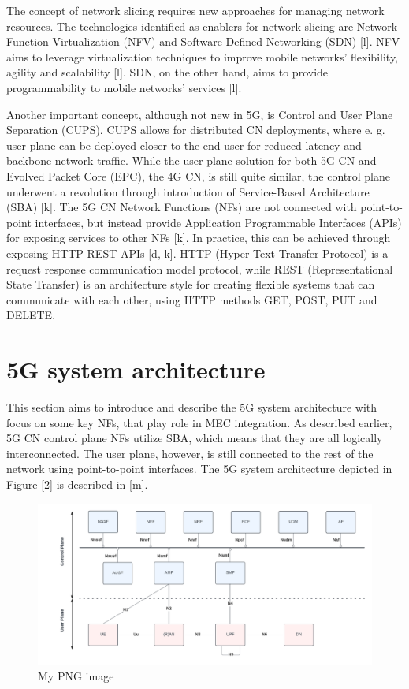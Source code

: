 \documentclass[12pt,a4paper,twoside]{report}
\begin{document}
The concept of network slicing requires new approaches for managing network resources. The technologies identified as enablers for network slicing are Network Function Virtualization (NFV) and Software Defined Networking (SDN) [l]. NFV aims to leverage virtualization techniques to improve mobile networks’ flexibility, agility and scalability [l]. SDN, on the other hand, aims to provide programmability to mobile networks’ services [l]. 
  
Another important concept, although not new in 5G, is Control and User Plane Separation (CUPS). CUPS allows for distributed CN deployments, where e. g. user plane can be deployed closer to the end user for reduced latency and backbone network traffic. While the user plane solution for both 5G CN and Evolved Packet Core (EPC), the 4G CN, is still quite similar, the control plane underwent a revolution through introduction of Service-Based Architecture (SBA) [k]. The 5G CN Network Functions (NFs) are not connected with point-to-point interfaces, but instead provide Application Programmable Interfaces (APIs) for exposing services to other NFs [k]. In practice, this can be achieved through exposing HTTP REST APIs [d, k]. HTTP (Hyper Text Transfer Protocol) is a request response communication model protocol, while REST (Representational State Transfer) is an architecture style for creating flexible systems that can communicate with each other, using HTTP methods GET, POST, PUT and DELETE. 

\section{5G system architecture}
This section aims to introduce and describe the 5G system architecture with focus on some key NFs, that play role in MEC integration. As described earlier, 5G CN control plane NFs utilize SBA, which means that they are all logically interconnected. The user plane, however, is still connected to the rest of the network using point-to-point interfaces. The 5G system architecture depicted in Figure [2] is described in [m].

\begin{figure}[ht]
	\centering
	\includegraphics[width=\textwidth]{./images/5G-CN.png}
	\caption{My PNG image}
\end{figure}
\end{document}
